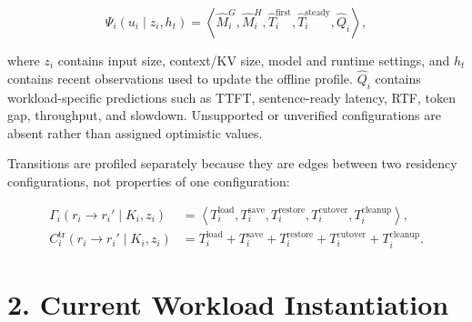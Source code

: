 \documentclass[10pt]{article}
\begin{document}
\begin{equation}
\Psi_i(u_i\mid z_i,h_t)=\left\langle
    \widehat M_i^{G},\widehat M_i^{H},
    \widehat T_i^{\mathrm{first}},\widehat T_i^{\mathrm{steady}},
    \widehat Q_i
\right\rangle ,
\end{equation}

where $z_i$ contains input size, context/KV size, model and runtime settings,
and $h_t$ contains recent observations used to update the offline profile.
$\widehat Q_i$ contains workload-specific predictions such as TTFT,
sentence-ready latency, RTF, token gap, throughput, and slowdown.  Unsupported
or unverified configurations are absent rather than assigned optimistic values.

Transitions are profiled separately because they are edges between two
residency configurations, not properties of one configuration:

\begin{align}
\Gamma_i(r_i\!\rightarrow r_i'\mid K_i,z_i)
   &=\left\langle T_i^{\mathrm{load}},T_i^{\mathrm{save}},
      T_i^{\mathrm{restore}},T_i^{\mathrm{cutover}},
      T_i^{\mathrm{cleanup}}\right\rangle ,\\
C_i^{\mathrm{tr}}(r_i\!\rightarrow r_i'\mid K_i,z_i)
   &=T_i^{\mathrm{load}}+T_i^{\mathrm{save}}
     +T_i^{\mathrm{restore}}+T_i^{\mathrm{cutover}}
     +T_i^{\mathrm{cleanup}}.
\end{align}

\section*{2. Current Workload Instantiation}
\end{document}

